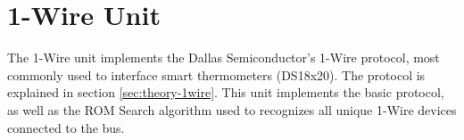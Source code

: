 \section{1-Wire Unit}

The 1-Wire unit implements the Dallas Semiconductor's 1-Wire protocol, most commonly used to interface smart thermometers (DS18x20). The protocol is explained in section \ref{sec:theory-1wire}. This unit implements the basic protocol, as well as the ROM Search algorithm used to recognizes all unique 1-Wire devices connected to the bus.
